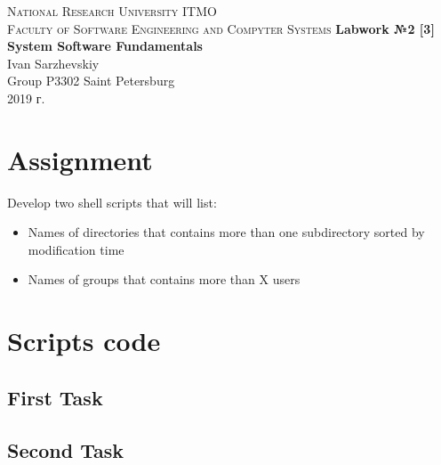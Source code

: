 \documentclass[12pt, a4paper]{article}
\begin{document}
\begin{titlepage}
\begin{center}

\textsc{National Research University ITMO\\[4mm]
Faculty of Software Engineering and Compyter Systems}
\vfill
\textbf{Labwork №2 [3]\\[4mm]
System Software Fundamentals\\[16mm]
}
Ivan Sarzhevskiy
\\[2mm]Group P3302
\vfill
Saint Petersburg\\[2mm]
2019 г.

\end{center}
\end{titlepage}

\section*{Assignment}
Develop two shell scripts that will list:
\begin{itemize}
  \item Names of directories that contains more than one subdirectory sorted
    by modification time
  \item Names of groups that contains more than X users
\end{itemize}

\section*{Scripts code}
\subsection*{First Task}



\subsection*{Second Task}

\end{document}
